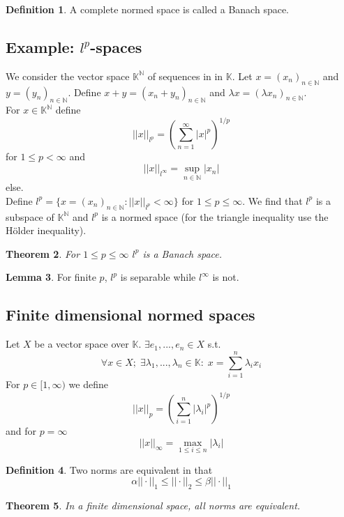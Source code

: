 \documentclass[a4paper, 12pt]{article}
\theoremstyle{plain}
\newtheorem{theorem}{Theorem}[subsection] %
\theoremstyle{definition}
\newtheorem{definition}[theorem]{Definition} %
\theoremstyle{lemma}
\newtheorem{lemma}[theorem]{Lemma}
\theoremstyle{remark}
\theoremstyle{corollary}
\theoremstyle{example}
\begin{document}
	\begin{definition}
		A complete normed space is called a Banach space.
	\end{definition}

	\subsection{Example: $l^p$-spaces}
	We consider the vector space $\mathbb{K}^\mathbb{N}$ of sequences in in $\mathbb{K}$. Let $x = (x_n)_{n \in \mathbb{N}}$ and $y = (y_n)_{n \in \mathbb{N}}$. Define $x+y = (x_n+y_n)_{n \in \mathbb{N}}$ and $\lambda x = (\lambda x_n)_{n \in \mathbb{N}}$.\\
	For $x \in \mathbb{K}^\mathbb{N}$ define \[||x||_{l^p} = \left(\sum_{n=1}^\infty \left|x\right|^p\right)^{1/p}\] for $1\leq p < \infty$ and \[||x||_{l^\infty} = \sup\limits_{n \in \mathbb{N}} \left|x_n\right|\] else.\\
	Define $l^p = \{x = (x_n)_{n \in \mathbb{N}}: ||x||_{l^p} < \infty\}$ for $1 \leq p \leq \infty$. We find that $l^p$ is a subspace of $\mathbb{K}^\mathbb{N}$ and $l^p$ is a normed space (for the triangle inequality use the Hölder inequality).
	\begin{theorem}
		For $1 \leq p \leq \infty$ $l^p$ is a Banach space.
	\end{theorem}
	\begin{lemma}
		For finite $p$, $l^p$ is separable while $l^\infty$ is not.
	\end{lemma}

	\subsection{Finite dimensional normed spaces}
	Let $X$ be a vector space over $\mathbb{K}$. $\exists e_1,...,e_n \in X$ s.t. \[\forall x \in X; \; \exists \lambda_1,...,\lambda_n \in \mathbb{K}: \; x = \sum_{i=1}^n \lambda_i x_i\]
	For $p \in [1,\infty)$ we define \[||x||_p = \left(\sum_{i=1}^n \left|\lambda_i\right|^p\right)^{1/p}\] and for $p = \infty$ \[||x||_\infty = \max\limits_{1 \leq i \leq n} \left|\lambda_i\right|\]
	
	\begin{definition}
		Two norms are equivalent in that \[\alpha ||\cdot ||_1 \leq ||\cdot ||_2 \leq \beta ||\cdot ||_1\]
	\end{definition}

	\begin{theorem}
		In a finite dimensional space, all norms are equivalent.
	\end{theorem}
\end{document}
